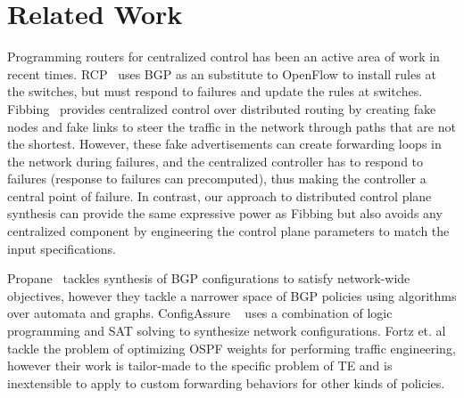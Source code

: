 \section{Related Work}
Programming routers for centralized control has been an
active area of work in recent times. RCP~\cite{rcp} uses
BGP as an substitute to OpenFlow to install rules at the 
switches, but must respond to failures and update the 
rules at switches. Fibbing~\cite{fibbing} provides 
centralized control over distributed routing by creating 
fake nodes and fake links to steer the traffic in the 
network through paths that are not the shortest. However, 
these fake advertisements can create forwarding loops in the
network during failures, and the centralized controller 
has to respond to failures (response to failures can precomputed),
thus making the controller a central point of failure. In contrast,
our approach to distributed control plane synthesis can provide
the same expressive power as Fibbing but also
avoids any centralized component by engineering 
the control plane parameters to match the input specifications. 

 Propane~\cite{propane} 
tackles synthesis of BGP configurations to satisfy network-wide
objectives, however they tackle a narrower space of BGP policies
using algorithms over automata and graphs. ConfigAssure
~\cite{configassure} uses a combination of 
logic programming and SAT solving to synthesize network
configurations. Fortz et. al~\cite{ospf-te} tackle the 
problem of optimizing OSPF weights for performing traffic
engineering, however their work is tailor-made to the 
specific problem of TE and is inextensible to apply 
to custom forwarding behaviors for other kinds of policies.

